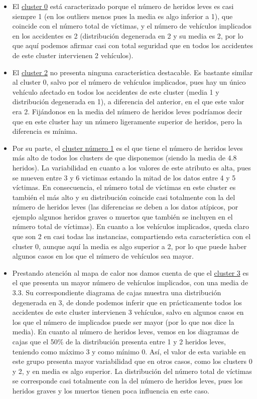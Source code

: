 \documentclass[a4paper,11pt]{book}
\begin{document}
\begin{itemize}
	\item El \underline{cluster 0} está caracterizado porque el número de heridos leves es casi siempre 1 (en los outliers menos pues la media es algo inferior a 1), que coincide con el número total de víctimas, y el número de vehículos implicados en los accidentes es 2 (distribución degenerada en 2 y su media es 2, por lo que aquí podemos afirmar casi con total seguridad que en todos los accidentes de este cluster intervienen 2 vehículos).
	\item El \underline{cluster 2} no presenta ninguna característica destacable. Es bastante similar al cluster 0, salvo por el número de vehículos implicados, pues hay un único vehículo afectado en todos los accidentes de este cluster (media 1 y distribución degenerada en 1), a diferencia del anterior, en el que este valor era 2. Fijándonos en la media del número de heridos leves podríamos decir que en este cluster hay un número ligeramente superior de heridos, pero la diferencia es mínima. 
	
	\item Por su parte, el \underline{cluster número 1} es el que tiene el número de heridos leves más alto de todos los clusters de que disponemos (siendo la media de 4.8 heridos). La variabilidad en cuanto a los valores de este atributo es alta, pues se mueven entre 3 y 6 victimas estando la mitad de los datos entre 4 y 5 víctimas. En consecuencia, el número total de víctimas en este cluster es también el más alto y su distribución coincide casi totalmente con la del número de heridos leves (las diferencias se deben a los datos atípicos, por ejemplo algunos heridos graves o muertos que también se incluyen en el número total de víctimas). En cuanto a los vehículos implicados, queda claro que son 2 en casi todas las instancias, compartiendo esta característica con el cluster 0, aunque aquí la media es algo superior a 2, por lo que puede haber algunos casos en los que el número de vehículos sea mayor.
	
	\item Prestando atención al mapa de calor nos damos cuenta de que el \underline{cluster 3} es el que presenta un mayor número de vehículos implicados, con una media de 3.3. Su correspondiente diagrama de cajas muestra una distribución degenerada en 3, de donde podemos inferir que en prácticamente todos los accidentes de este cluster intervienen 3 vehículos, salvo en algunos casos en los que el número de implicados puede ser mayor (por lo que nos dice la media). En cuanto al número de heridos leves, vemos en los diagramas de cajas que el 50\% de la distribución presenta entre 1 y 2 heridos leves, teniendo como máximo 3 y como mínimo 0. Así, el valor de esta variable en este grupo presenta mayor variabilidad que en otros casos, como los clusters 0 y 2, y en media es algo superior. La distribución del número total de víctimas se corresponde casi totalmente con la del número de heridos leves, pues los heridos graves y los muertos tienen poca influencia en este caso. 
	

\end{itemize}
\end{document}
